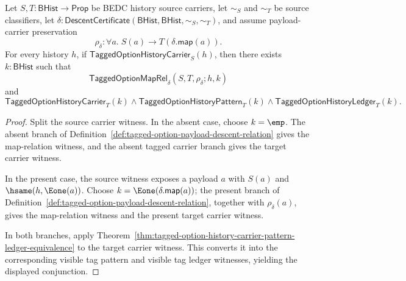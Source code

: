 \begin{theorem}
\label{thm:tagged-option-payload-descent-total-endpoint-transport}
\label{thm:tagged-option-maprel-total-carrier-transport}
Let $S,T:\mathsf{BHist}\to\mathsf{Prop}$ be BEDC history source carriers, let
$\sim_S$ and $\sim_T$ be source classifiers, let
$\delta:\mathsf{DescentCertificate}(\mathsf{BHist},\mathsf{BHist},\sim_S,\sim_T)$,
and assume payload-carrier preservation
$$
\rho_{\delta}:\forall a.\;S(a)\to T(\delta.\mathsf{map}(a)).
$$
For every history $h$, if
$\mathsf{TaggedOptionHistoryCarrier}_S(h)$, then there exists
$k:\mathsf{BHist}$ such that
$$
\mathsf{TaggedOptionMapRel}_{\delta}(S,T,\rho_{\delta};h,k)
$$
and
$$
\mathsf{TaggedOptionHistoryCarrier}_T(k)\land
\mathsf{TaggedOptionHistoryPattern}_T(k)\land
\mathsf{TaggedOptionHistoryLedger}_T(k).
$$
\end{theorem}
\begin{proof}
Split the source carrier witness. In the absent case, choose $k=\emp$. The
absent branch of Definition~\ref{def:tagged-option-payload-descent-relation}
gives the map-relation witness, and the absent tagged carrier branch gives the
target carrier witness.

In the present case, the source witness exposes a payload $a$ with $S(a)$ and
$\hsame(h,\Eone(a))$. Choose $k=\Eone(\delta.\mathsf{map}(a))$; the present
branch of Definition~\ref{def:tagged-option-payload-descent-relation}, together
with $\rho_{\delta}(a)$, gives the map-relation witness and the present target
carrier witness.

In both branches, apply
Theorem~\ref{thm:tagged-option-history-carrier-pattern-ledger-equivalence} to
the target carrier witness. This converts it into the corresponding visible tag
pattern and visible tag ledger witnesses, yielding the displayed conjunction.
\end{proof}

